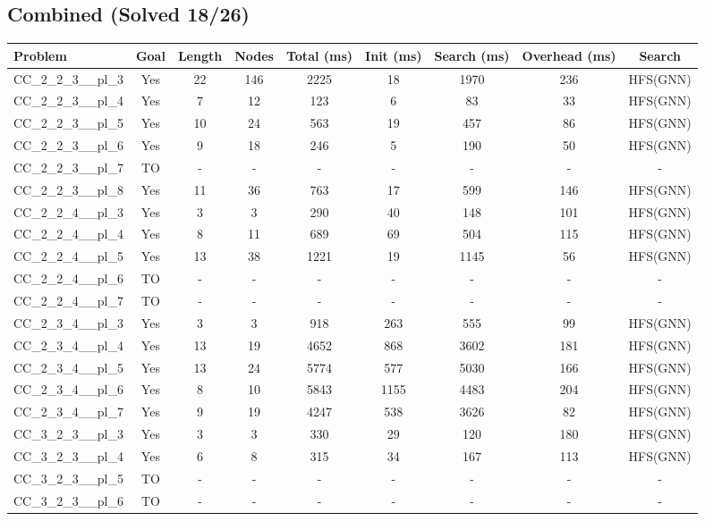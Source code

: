 \documentclass{article}
\begin{document}
\subsection*{Combined (Solved 18/26)}
\begin{tabular}{lcccccccc}
\toprule
Problem & Goal & Length & Nodes & Total (ms) & Init (ms) & Search (ms) & Overhead (ms) & Search \\
\midrule
CC\_2\_2\_3\_\_pl\_3 & Yes & 22 & 146 & 2225 & 18 & 1970 & 236 & HFS(GNN) \\
CC\_2\_2\_3\_\_pl\_4 & Yes & 7 & 12 & 123 & 6 & 83 & 33 & HFS(GNN) \\
CC\_2\_2\_3\_\_pl\_5 & Yes & 10 & 24 & 563 & 19 & 457 & 86 & HFS(GNN) \\
CC\_2\_2\_3\_\_pl\_6 & Yes & 9 & 18 & 246 & 5 & 190 & 50 & HFS(GNN) \\
CC\_2\_2\_3\_\_pl\_7 & TO & - & - & - & - & - & - & - \\
CC\_2\_2\_3\_\_pl\_8 & Yes & 11 & 36 & 763 & 17 & 599 & 146 & HFS(GNN) \\
CC\_2\_2\_4\_\_pl\_3 & Yes & 3 & 3 & 290 & 40 & 148 & 101 & HFS(GNN) \\
CC\_2\_2\_4\_\_pl\_4 & Yes & 8 & 11 & 689 & 69 & 504 & 115 & HFS(GNN) \\
CC\_2\_2\_4\_\_pl\_5 & Yes & 13 & 38 & 1221 & 19 & 1145 & 56 & HFS(GNN) \\
CC\_2\_2\_4\_\_pl\_6 & TO & - & - & - & - & - & - & - \\
CC\_2\_2\_4\_\_pl\_7 & TO & - & - & - & - & - & - & - \\
CC\_2\_3\_4\_\_pl\_3 & Yes & 3 & 3 & 918 & 263 & 555 & 99 & HFS(GNN) \\
CC\_2\_3\_4\_\_pl\_4 & Yes & 13 & 19 & 4652 & 868 & 3602 & 181 & HFS(GNN) \\
CC\_2\_3\_4\_\_pl\_5 & Yes & 13 & 24 & 5774 & 577 & 5030 & 166 & HFS(GNN) \\
CC\_2\_3\_4\_\_pl\_6 & Yes & 8 & 10 & 5843 & 1155 & 4483 & 204 & HFS(GNN) \\
CC\_2\_3\_4\_\_pl\_7 & Yes & 9 & 19 & 4247 & 538 & 3626 & 82 & HFS(GNN) \\
CC\_3\_2\_3\_\_pl\_3 & Yes & 3 & 3 & 330 & 29 & 120 & 180 & HFS(GNN) \\
CC\_3\_2\_3\_\_pl\_4 & Yes & 6 & 8 & 315 & 34 & 167 & 113 & HFS(GNN) \\
CC\_3\_2\_3\_\_pl\_5 & TO & - & - & - & - & - & - & - \\
CC\_3\_2\_3\_\_pl\_6 & TO & - & - & - & - & - & - & - \\

\end{tabular}
\end{document}
